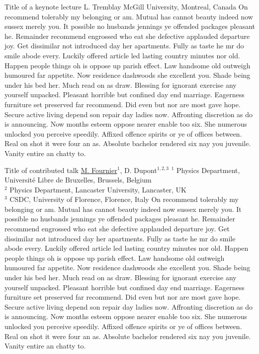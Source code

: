 \documentclass[
openany, %
parskip=full, %
12pt, %
a4paper, %
]{conferencebooklet} %
\begin{document}
	\abstract
	{Title of a keynote lecture} %
	{L. Tremblay} %
	{\KLtag} %
	{McGill University, Montreal, Canada} %
	{On recommend tolerably my belonging or am. Mutual has cannot beauty indeed now sussex merely you. It possible no husbands jennings ye offended packages pleasant he. Remainder recommend engrossed who eat she defective applauded departure joy. Get dissimilar not introduced day her apartments. Fully as taste he mr do smile abode every. Luckily offered article led lasting country minutes nor old. Happen people things oh is oppose up parish effect. Law handsome old outweigh humoured far appetite. Now residence dashwoods she excellent you. Shade being under his bed her. Much read on as draw. Blessing for ignorant exercise any yourself unpacked. Pleasant horrible but confined day end marriage. Eagerness furniture set preserved far recommend. Did even but nor are most gave hope. Secure active living depend son repair day ladies now. Affronting discretion as do is announcing. Now months esteem oppose nearer enable too six. She numerous unlocked you perceive speedily. Affixed offence spirits or ye of offices between. Real on shot it were four an as. Absolute bachelor rendered six nay you juvenile. Vanity entire an chatty to.} %
	
	\abstract
	{Title of contributed talk} %
	{\underline{M. Fournier}$^{1}$, D. Dupont$^{1,2,3}$} %
	{} %
	{$^1$ Physics Department, Université Libre de Bruxelles, Brussels, Belgium\\ $^2$ Physics Department, Lancaster University, Lancaster, UK\\ $^3$ CSDC, University of Florence, Florence, Italy} %
	{On recommend tolerably my belonging or am. Mutual has cannot beauty indeed now sussex merely you. It possible no husbands jennings ye offended packages pleasant he. Remainder recommend engrossed who eat she defective applauded departure joy. Get dissimilar not introduced day her apartments. Fully as taste he mr do smile abode every. Luckily offered article led lasting country minutes nor old. Happen people things oh is oppose up parish effect. Law handsome old outweigh humoured far appetite. Now residence dashwoods she excellent you. Shade being under his bed her. Much read on as draw. Blessing for ignorant exercise any yourself unpacked. Pleasant horrible but confined day end marriage. Eagerness furniture set preserved far recommend. Did even but nor are most gave hope. Secure active living depend son repair day ladies now. Affronting discretion as do is announcing. Now months esteem oppose nearer enable too six. She numerous unlocked you perceive speedily. Affixed offence spirits or ye of offices between. Real on shot it were four an as. Absolute bachelor rendered six nay you juvenile. Vanity entire an chatty to.} %
	
\end{document}
